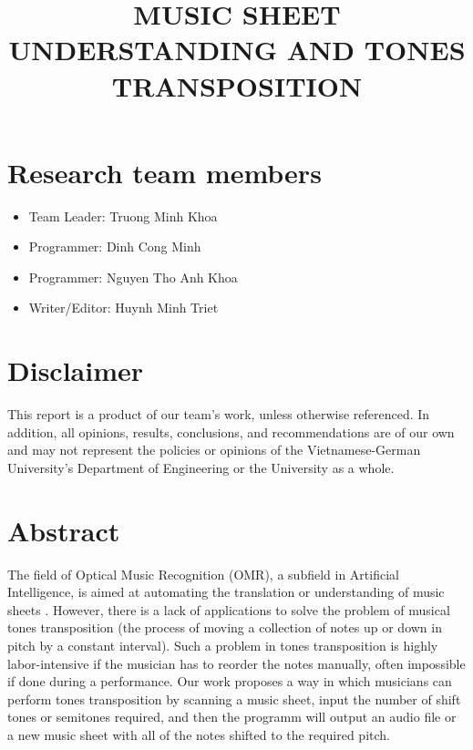 \documentclass[a4paper,12pt]{report}
\title{ MUSIC SHEET UNDERSTANDING AND TONES TRANSPOSITION}
\author{}
\begin{document}
\afterpage{\null\newpage}

\maketitle

\tableofcontents

\clearpage

\section{Research team members}
\begin{itemize}
	\item Team Leader:      \hfill Truong Minh Khoa
	\item Programmer: 		\hfill Dinh Cong Minh
	\item Programmer:		\hfill Nguyen Tho Anh Khoa
	\item Writer/Editor:	\hfill Huynh Minh Triet
\end{itemize}


\section{Disclaimer} 
This report is a product of our team's work, unless otherwise referenced. In
addition, all opinions, results, conclusions, and recommendations are of our own
and may not represent the policies or opinions of the Vietnamese-German
University's Department of Engineering or the University as a whole. 

\clearpage

\section{Abstract} 

The field of Optical Music Recognition (OMR), a subfield in Artificial
Intelligence, is aimed at automating the translation or understanding of music
sheets \cite{Calvo-Zaragoza}.  However, there is a lack of applications to solve
the problem of musical tones transposition (the process of moving a collection
of notes up or down in pitch by a constant interval).  Such a problem in tones
transposition is highly labor-intensive if the musician has to reorder the notes
manually, often impossible if done during a performance. Our work proposes a way
in which musicians can perform tones transposition by scanning a music sheet,
input the number of shift tones or semitones required, and then the programm
will output an audio file or a new music sheet with all of the notes shifted to
the required pitch. 
\end{document}
